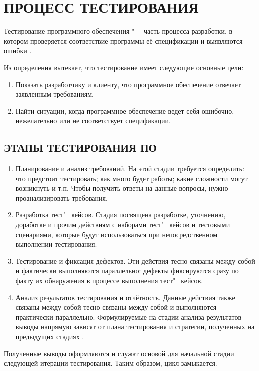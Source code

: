 \section{ПРОЦЕСС ТЕСТИРОВАНИЯ}
Тестирование программного обеспечения "--- часть процесса разработки, в котором 
проверяется соответствие программы её спецификации и выявляются ошибки \cite{Staroletov}.

Из определения вытекает, что тестирование имеет следующие основные цели:
\begin{enumerate}
    \item Показать разработчику и клиенту, что программное обеспечение отвечает 
    заявленным требованиям.
    \item Найти ситуации, когда программное обеспечение ведет себя ошибочно, 
    нежелательно или не соответствует спецификации.
\end{enumerate}
\subsection{ЭТАПЫ ТЕСТИРОВАНИЯ ПО}
\begin{enumerate}
    \item Планирование и анализ требований. На этой стадии требуется определить: 
    что предстоит тестировать; как много будет работы; какие сложности могут 
    возникнуть и т.п. Чтобы получить ответы на данные вопросы, нужно 
    проанализировать требования. 
    \item Разработка тест"=кейсов. Стадия посвящена разработке, уточнению, 
    доработке и прочим действиям с наборами тест"=кейсов и тестовыми сценариями, 
    которые будут использоваться при непосредственном выполнении тестирования.
    \item Тестирование и фиксация дефектов. Эти действия тесно связаны между 
    собой и фактически выполняются параллельно: дефекты фиксируются сразу по 
    факту их обнаружения в процессе выполнения тест"=кейсов.
    \item Анализ результатов тестирования и отчётность. Данные действия также 
    связаны между собой тесно связаны между собой и выполняются практически 
    параллельно. Формулируемые на стадии анализа результатов выводы напрямую 
    зависят от плана тестирования и стратегии, полученных на предыдущих стадиях 
    \cite{Kulikov}.
\end{enumerate}
Полученные выводы оформляются и служат основой для начальной стадии следующей 
итерации тестирования. Таким образом, цикл замыкается.

